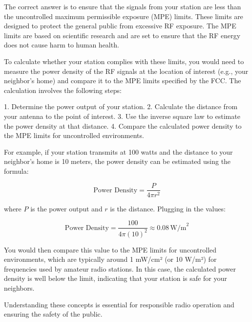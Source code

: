 The correct answer is to ensure that the signals from your station are less than the uncontrolled maximum permissible exposure (MPE) limits. These limits are designed to protect the general public from excessive RF exposure. The MPE limits are based on scientific research and are set to ensure that the RF energy does not cause harm to human health.

To calculate whether your station complies with these limits, you would need to measure the power density of the RF signals at the location of interest (e.g., your neighbor’s home) and compare it to the MPE limits specified by the FCC. The calculation involves the following steps:

1. Determine the power output of your station.
2. Calculate the distance from your antenna to the point of interest.
3. Use the inverse square law to estimate the power density at that distance.
4. Compare the calculated power density to the MPE limits for uncontrolled environments.

For example, if your station transmits at 100 watts and the distance to your neighbor’s home is 10 meters, the power density can be estimated using the formula:

\[
\text{Power Density} = \frac{P}{4 \pi r^2}
\]

where \( P \) is the power output and \( r \) is the distance. Plugging in the values:

\[
\text{Power Density} = \frac{100}{4 \pi (10)^2} \approx 0.08 \, \text{W/m}^2
\]

You would then compare this value to the MPE limits for uncontrolled environments, which are typically around 1 mW/cm² (or 10 W/m²) for frequencies used by amateur radio stations. In this case, the calculated power density is well below the limit, indicating that your station is safe for your neighbors.

Understanding these concepts is essential for responsible radio operation and ensuring the safety of the public.

